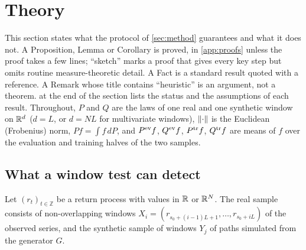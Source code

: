 \section{Theory}\label{sec:theory}

This section states what the protocol of \cref{sec:method} guarantees and what it does not. A
Proposition, Lemma or Corollary is proved, in \cref{app:proofs} unless the proof takes a few
lines; ``sketch'' marks a proof that gives every key step but omits routine measure-theoretic
detail. A Fact is a standard result quoted with a reference. A Remark whose title contains
``heuristic'' is an argument, not a theorem.  at the end of the section
lists the status and the assumptions of each result. Throughout, $P$ and $Q$ are the laws of one
real and one synthetic window on $\mathbb{R}^d$ ($d=L$, or $d=NL$ for multivariate windows), $\lVert\cdot\rVert$
is the Euclidean (Frobenius) norm, $Pf=\int f\,dP$, and $P^{\mathrm{ev}} f$, $Q^{\mathrm{ev}} f$, $P^{\mathrm{tr}} f$, $Q^{\mathrm{tr}} f$
are means of $f$ over the evaluation and training halves of the two samples.

\subsection{What a window test can detect}\label{sec:theory-windows}

Let $(r_t)_{t\in\mathbb Z}$ be a return process with values in $\mathbb{R}$ or $\mathbb{R}^N$. The real sample
consists of non-overlapping windows $X_i=(r_{s_0+(i-1)L+1},\dots,r_{s_0+iL})$ of the observed
series, and the synthetic sample of windows $Y_j$ of paths simulated from the generator $G$.

